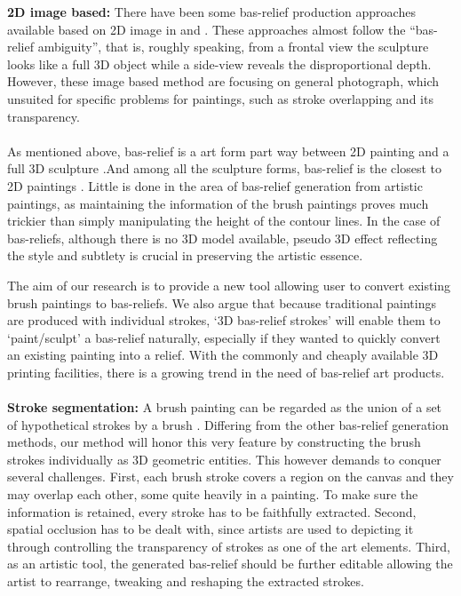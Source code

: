 \textbf{2D image based:}
There have been some bas-relief production approaches available based on 2D image in\cite{zeng2014region}\cite{wu2013making} and \cite{alexa2010reliefs}. These approaches almost follow the “bas-relief ambiguity”\cite{belhumeur1999bas}, that is, roughly speaking, from a frontal view the sculpture looks like a full 3D object while a side-view reveals the disproportional depth. 
However, these image based method are focusing on general photograph, which unsuited for specific problems for paintings, such as stroke overlapping and its transparency.  \\ \\ 
As mentioned above, bas-relief is a art form part way between 2D painting and a full 3D sculpture \cite{weyrich2007digital}.And among all the sculpture forms, bas-relief is the closest to 2D paintings\cite{kerber2009feature} \cite{barron2012color}.
Little is done in the area of bas-relief generation from artistic paintings, as maintaining the information of the brush paintings proves much trickier than simply manipulating the height of the contour lines. In the case of bas-reliefs, although there is no 3D model available, pseudo 3D effect reflecting the style and subtlety is crucial in preserving the artistic essence.

The aim of our research is to provide a new tool allowing user to convert existing brush paintings to bas-reliefs. We also argue that because traditional paintings are produced with individual strokes, ‘3D bas-relief strokes’ will enable them to ‘paint/sculpt’ a bas-relief naturally, especially if they wanted to quickly convert an existing painting into a relief. With the commonly and cheaply available 3D printing facilities, there is a growing trend in the need of bas-relief art products.\\ \\ 
\textbf{Stroke segmentation:}
A brush painting can be regarded as the union of a set of hypothetical strokes by a brush \cite{xu2006animating}. Differing from the other bas-relief generation methods, our method will honor this very feature by constructing the brush strokes individually as 3D geometric entities. This however demands to conquer several challenges. First, each brush stroke covers a region on the canvas and they may overlap each other, some quite heavily in a painting. To make sure the information is retained, every stroke has to be faithfully extracted. Second, spatial occlusion has to be dealt with, since artists are used to depicting it through controlling the transparency of strokes as one of the art elements. Third, as an artistic tool, the generated bas-relief should be further editable allowing the artist to rearrange, tweaking and reshaping the extracted strokes.

